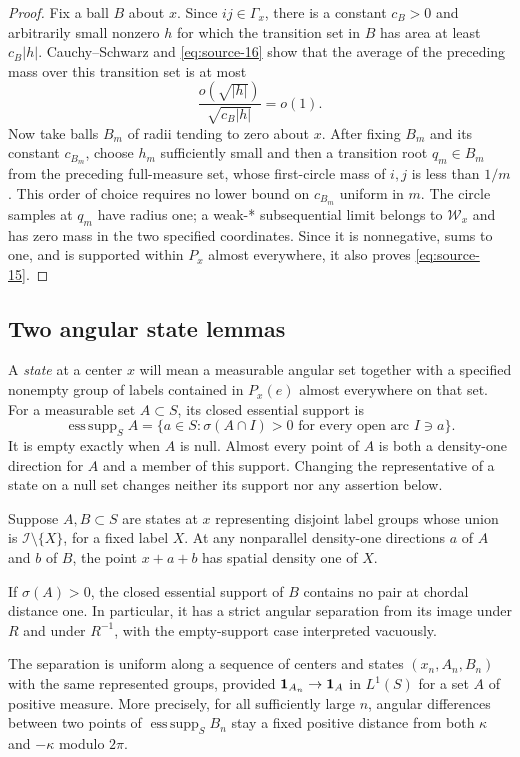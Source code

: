 \begin{proof}
Fix a ball $B$ about $x$.  Since $ij\in\Gamma_x$, there is a constant
$c_B>0$ and arbitrarily small nonzero $h$ for which the transition set
in $B$ has area at least $c_B|h|$.  Cauchy--Schwarz and
\eqref{eq:source-16} show that the average of the preceding mass over
this transition set is at most
\[
 \frac{o(\sqrt{|h|})}{\sqrt{c_B|h|}}=o(1).
\]
Now take balls $B_m$ of radii tending to zero about $x$.  After fixing
$B_m$ and its constant $c_{B_m}$, choose $h_m$ sufficiently small and
then a transition root $q_m\in B_m$ from the preceding full-measure set,
whose first-circle mass of $i,j$ is less than $1/m$.  This order of choice requires no lower bound
on $c_{B_m}$ uniform in $m$.  The circle samples at $q_m$ have radius
one; a weak-* subsequential limit belongs to $\mathcal W_x$ and has
zero mass in the two specified coordinates.  Since it is nonnegative,
sums to one, and is supported within $P_x$ almost everywhere, it also
proves \eqref{eq:source-15}.
\end{proof}

\subsection{Two angular state lemmas}

A \emph{state} at a center $x$ will mean a measurable angular set
together with a specified nonempty group of labels contained in
$P_x(e)$ almost everywhere on that set.  For a measurable set
$A\subset S$, its closed essential support is
\[
 \operatorname{ess\,supp}_S A
 =\{a\in S:\sigma(A\cap I)>0\text{ for every open arc }I\ni a\}.
\]
It is empty exactly when $A$ is null.  Almost every point of $A$ is
both a density-one direction for $A$ and a member of this support.
Changing the representative of a state on a null set changes neither
its support nor any assertion below.

\begin{lemma}
\label{lem:transitions-strict-separation}
Suppose $A,B\subset S$ are states at $x$ representing disjoint label
groups whose union is $\mathcal I\setminus\{X\}$, for a fixed label
$X$.  At any nonparallel density-one directions $a$ of $A$ and $b$ of
$B$, the point $x+a+b$ has spatial density one of $X$.

If $\sigma(A)>0$, the closed essential support of $B$ contains no
pair at chordal distance one.  In particular, it has a strict angular
separation from its image under $R$ and under $R^{-1}$, with the
empty-support case interpreted vacuously.

The separation is uniform along a sequence of centers and states
$(x_n,A_n,B_n)$ with the same represented groups, provided
$\mathbf 1_{A_n}\to\mathbf 1_A$ in $L^1(S)$ for a set $A$ of positive measure.
More precisely, for all sufficiently large $n$, angular differences
between two points of $\operatorname{ess\,supp}_S B_n$ stay a fixed
positive distance from both $\kappa$ and $-\kappa$ modulo $2\pi$.
\end{lemma}

